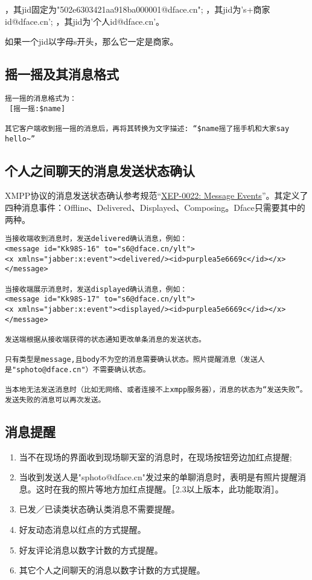 \begin{enumerate}
，其jid固定为"502e6303421aa918ba000001@dface.cn";
，其jid为's+商家id@dface.cn';
，其jid为'个人id@dface.cn'。
\end{enumerate}
如果一个jid以字母s开头，那么它一定是商家。


\subsection{摇一摇及其消息格式}

\begin{verbatim}
摇一摇的消息格式为：
 [摇一摇:$name]

其它客户端收到摇一摇的消息后，再将其转换为文字描述: “$name摇了摇手机和大家say hello~”
\end{verbatim}



\subsection{个人之间聊天的消息发送状态确认}
XMPP协议的消息发送状态确认参考规范“\href{http://xmpp.org/extensions/xep-0022.html}{XEP-0022: Message Events}”。其定义了四种消息事件：Offline、Delivered、Displayed、Composing。Dface只需要其中的两种。

\begin{verbatim}
当接收端收到消息时，发送delivered确认消息，例如：
<message id="Kk98S-16" to="s6@dface.cn/ylt">
<x xmlns="jabber:x:event"><delivered/><id>purplea5e6669c</id></x>
</message>

当接收端展示消息时，发送displayed确认消息，例如：
<message id="Kk98S-17" to="s6@dface.cn/ylt">
<x xmlns="jabber:x:event"><displayed/><id>purplea5e6669c</id></x>
</message>

发送端根据从接收端获得的状态通知更改单条消息的发送状态。

只有类型是message,且body不为空的消息需要确认状态。照片提醒消息（发送人是"sphoto@dface.cn"）不需要确认状态。

当本地无法发送消息时（比如无网络、或者连接不上xmpp服务器），消息的状态为“发送失败”。发送失败的消息可以再次发送。

\end{verbatim}

\subsection{消息提醒}
\begin{enumerate}
\item 当不在现场的界面收到现场聊天室的消息时，在现场按钮旁边加红点提醒;
\item 当收到发送人是"sphoto@dface.cn"发过来的单聊消息时，表明是有照片提醒消息。这时在我的照片等地方加红点提醒。［2.3以上版本，此功能取消］。
\item 已发／已读类状态确认类消息不需要提醒。
\item 好友动态消息以红点的方式提醒。
\item 好友评论消息以数字计数的方式提醒。
\item 其它个人之间聊天的消息以数字计数的方式提醒。
\end{enumerate}


